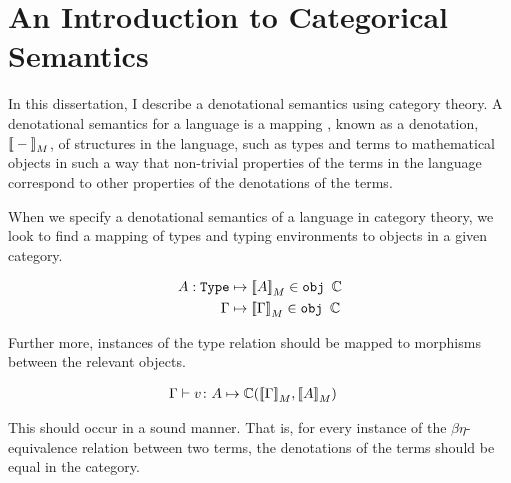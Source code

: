 \documentclass{Report}
\begin{document}
\section{An Introduction to Categorical Semantics}



In this dissertation, I describe a denotational semantics using category theory. A denotational semantics for a language is a mapping 
, known as a denotation, ${\bf [\![}-{\bf ]\!]}_M$, of structures in the language, such as types and terms to mathematical objects in such a way that non-trivial properties of the terms in the language correspond to other properties of the denotations of the terms.


When we specify a denotational semantics of a language in category theory, we look to find a mapping of types and typing environments to objects in a given category.


\begin{align}
    A: \texttt{Type} & \mapsto {\bf [\![}A{\bf ]\!]}_M \in \texttt{obj } \mathbb{C} \\
    \Gamma & \mapsto  {\bf [\![}\Gamma{\bf ]\!]}_M \in \texttt{obj } \mathbb{C}
\end{align}



Further more, instances of the type relation should be mapped to morphisms between the relevant objects.


\begin{align}
    \Gamma \vdash v \colon A & \mapsto \mathbb{C}({\bf [\![}\Gamma{\bf ]\!]}_M, {\bf [\![}A{\bf ]\!]}_M) 
\end{align}

This should occur in a sound manner. That is, for every instance of the $\beta\eta$-equivalence relation between two terms, the denotations of the terms should be equal in the category.
\end{document}
